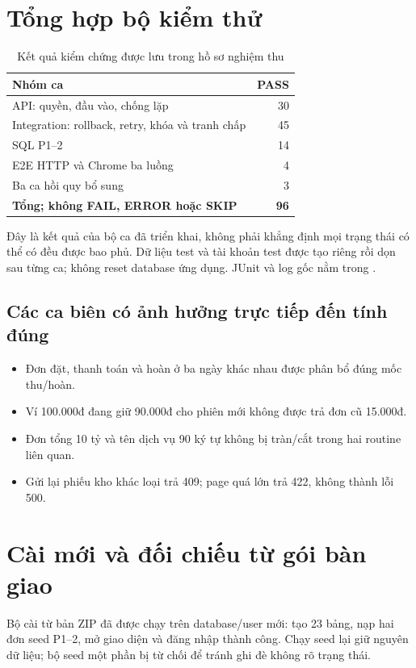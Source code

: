 \section{Tổng hợp bộ kiểm thử}
\begin{table}[H]\centering\caption{Kết quả kiểm chứng được lưu trong hồ sơ nghiệm thu}
\begin{tabularx}{\linewidth}{@{}Yr@{}}\toprule\textbf{Nhóm ca}&\textbf{PASS}\\\midrule
API: quyền, đầu vào, chống lặp &30\\
Integration: rollback, retry, khóa và tranh chấp &45\\
SQL P1–2 &14\\
E2E HTTP và Chrome ba luồng &4\\
Ba ca hồi quy bổ sung &3\\\midrule
\textbf{Tổng; không FAIL, ERROR hoặc SKIP}&\textbf{96}\\\bottomrule
\end{tabularx}\end{table}
Đây là kết quả của bộ ca đã triển khai, không phải khẳng định mọi trạng thái có thể có đều được bao phủ. Dữ liệu test và tài khoản test được tạo riêng rồi dọn sau từng ca; không reset database ứng dụng. JUnit và log gốc nằm trong .
\subsection{Các ca biên có ảnh hưởng trực tiếp đến tính đúng}
\begin{itemize}
\item Đơn đặt, thanh toán và hoàn ở ba ngày khác nhau được phân bổ đúng mốc thu/hoàn.
\item Ví 100.000đ đang giữ 90.000đ cho phiên mới không được trả đơn cũ 15.000đ.
\item Đơn tổng 10 tỷ và tên dịch vụ 90 ký tự không bị tràn/cắt trong hai routine liên quan.
\item Gửi lại phiếu kho khác loại trả 409; page quá lớn trả 422, không thành lỗi 500.
\end{itemize}
\section{Cài mới và đối chiếu từ gói bàn giao}
Bộ cài từ bản ZIP đã được chạy trên database/user mới: tạo 23 bảng, nạp hai đơn seed P1–2, mở giao diện và đăng nhập thành công. Chạy seed lại giữ nguyên dữ liệu; bộ seed một phần bị từ chối để tránh ghi đè không rõ trạng thái.

